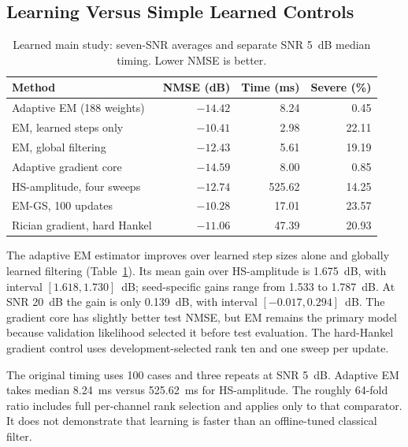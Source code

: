 \documentclass[10pt,journal,letterpaper]{IEEEtran}
\begin{document}
\subsection{Learning Versus Simple Learned Controls}
\begin{table}[!t]
\caption{Learned main study: seven-SNR averages and separate SNR 5~dB median timing. Lower NMSE is better.}
\label{tab:learned}\centering\footnotesize\setlength{\tabcolsep}{3pt}
\begin{tabular}{@{}lrrr@{}}\toprule
Method & NMSE (dB) & Time (ms) & Severe (\%)\\\midrule
Adaptive EM (188 weights) & $-14.42$ & 8.24 & 0.45\\
EM, learned steps only & $-10.41$ & 2.98 & 22.11\\
EM, global filtering & $-12.43$ & 5.61 & 19.19\\
Adaptive gradient core & $-14.59$ & 8.00 & 0.85\\
HS-amplitude, four sweeps & $-12.74$ & 525.62 & 14.25\\
EM-GS, 100 updates & $-10.28$ & 17.01 & 23.57\\
Rician gradient, hard Hankel & $-11.06$ & 47.39 & 20.93\\\bottomrule
\end{tabular}
\end{table}
The adaptive EM estimator improves over learned step sizes alone and globally learned filtering (Table~\ref{tab:learned}). Its mean gain over HS-amplitude is 1.675~dB, with interval $[1.618,1.730]$~dB; seed-specific gains range from 1.533 to 1.787~dB. At SNR 20~dB the gain is only 0.139~dB, with interval $[-0.017,0.294]$~dB. The gradient core has slightly better test NMSE, but EM remains the primary model because validation likelihood selected it before test evaluation. The hard-Hankel gradient control uses development-selected rank ten and one sweep per update.

The original timing uses 100 cases and three repeats at SNR 5~dB. Adaptive EM takes median 8.24~ms versus 525.62~ms for HS-amplitude. The roughly 64-fold ratio includes full per-channel rank selection and applies only to that comparator. It does not demonstrate that learning is faster than an offline-tuned classical filter.
\end{document}
